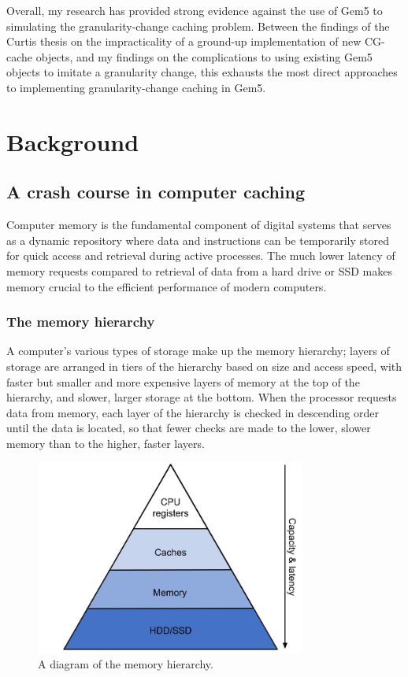 \documentclass[12pt,twoside]{reedthesis}
\begin{document}
Overall, my research has provided strong evidence against the use of Gem5 to simulating the granularity-change caching problem. Between the findings of the Curtis thesis on the impracticality of a ground-up implementation of new CG-cache objects, and my findings on the complications to using existing Gem5 objects to imitate a granularity change, this exhausts the most direct approaches to implementing granularity-change caching in Gem5.


\chapter{Background}

\section{A crash course in computer caching}

Computer memory is the fundamental component of digital systems that serves as a dynamic repository where data and instructions can be temporarily stored for quick access and retrieval during active processes. The much lower latency of memory requests compared to retrieval of data from a hard drive or SSD makes memory crucial to the efficient performance of modern computers.

	\subsection*{The memory hierarchy}

	A computer's various types of storage make up the memory hierarchy; layers of storage are arranged in tiers of the hierarchy based on size and access speed, with faster but smaller and more expensive layers of memory at the top of the hierarchy, and slower, larger storage at the bottom. When the processor requests data from memory, each layer of the hierarchy is checked in descending order until the data is located, so that fewer checks are made to the lower, slower memory than to the higher, faster layers.

	\begin{figure}[h]
    	\centering
    	\includegraphics[width=3.5in]{figures/mem_hierarchy.jpg}
    	\caption{A diagram of the memory hierarchy.}
	\end{figure}
\end{document}
